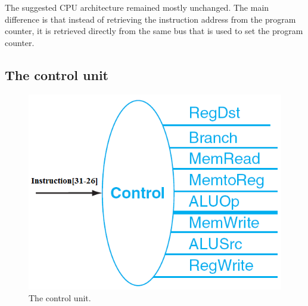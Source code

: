 The suggested CPU architecture remained mostly unchanged.
The main difference is that instead of retrieving the instruction address from the program counter, it is retrieved directly from the same bus that is used to set the program counter.

\subsection{The control unit}
\begin{figure}[ht]
    \centering
    \includegraphics[scale=1.0]{figures/controlunit.png}
    \caption{\label{fig:controlUnit}The control unit.}
\end{figure}
